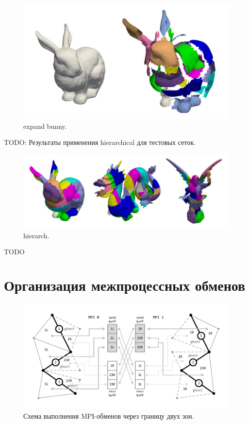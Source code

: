 \documentclass[
11pt,%
tightenlines,%
twoside,%
onecolumn,%
nofloats,%
nobibnotes,%
nofootinbib,%
superscriptaddress,%
noshowpacs,%
centertags]%
{revtex4}
\begin{document}
\begin{figure}[h]
\includegraphics[width=1.0\textwidth]{pics/03-explode-bunny.pdf}
\caption{expand bunny.}\label{fig:03-explode-bunny}
\end{figure}

TODO: Результаты применения hierarchical для тестовых сеток.

\begin{figure}[h]
\includegraphics[width=1.0\textwidth]{pics/03-hierarch.pdf}
\caption{hierarch.}\label{fig:03-hierarch}
\end{figure}

TODO

\section{Организация межпроцессных обменов}

\begin{figure}[h]
\includegraphics[width=1.0\textwidth]{pics/04-MPI.pdf}
\caption{Схема выполнения MPI-обменов через границу двух зон.}\label{fig:04-MPI}
\end{figure}
\end{document}

